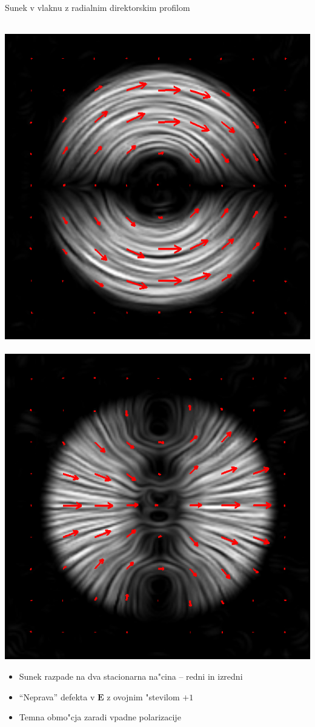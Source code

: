 \documentclass{beamer}
\renewcommand{\vec}{\mathbf}
\begin{document}
\begin{frame}{Sunek v vlaknu z radialnim direktorskim profilom}

 \begin{center}
  \,
 \includegraphics[width=.35\textwidth]{./Slike/licp_p1_74}\,
  \includegraphics[width=.35\textwidth]{./Slike/licp_p1_82}
\end{center}

\begin{itemize}
 \item Sunek razpade na dva stacionarna na"cina -- redni in izredni
 \item ``Neprava'' defekta v $\vec E$ z ovojnim "stevilom $+1$
 \item Temna obmo"cja zaradi vpadne polarizacije
\end{itemize}

\end{frame}
\end{document}
